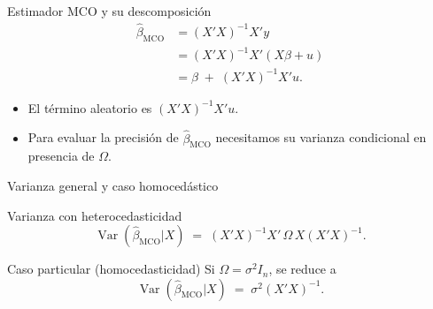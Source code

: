 \documentclass{beamer}
\begin{document}
\begin{frame}{Estimador MCO y su descomposición}
\begin{align*}
  \hat{\beta}_{\text{MCO}}
      &= (X'X)^{-1} X' y \\
      &= (X'X)^{-1} X' (X\beta + u) \\
      &= \beta \;+\; (X'X)^{-1} X' u.
\end{align*}
\medskip
\begin{itemize}
  \item El término aleatorio es $(X'X)^{-1}X'u$.
  \item Para evaluar la precisión de $\hat{\beta}_{\text{MCO}}$ necesitamos su
        varianza condicional en presencia de $\Omega$.
\end{itemize}
\end{frame}

\begin{frame}{Varianza general y caso homocedástico}
\begin{block}{Varianza con heterocedasticidad}
\[
  \operatorname{Var}(\hat{\beta}_{\text{MCO}}|X)
      \;=\;
      (X'X)^{-1} X' \,\Omega\, X (X'X)^{-1}.
\]
\end{block}
\begin{block}{Caso particular (homocedasticidad)}
Si $\Omega = \sigma^{2} I_n$, se reduce a
\[
  \operatorname{Var}(\hat{\beta}_{\text{MCO}}|X)
      \;=\;
      \sigma^{2} (X'X)^{-1}.
\]
\end{block}
\end{frame}
\end{document}

